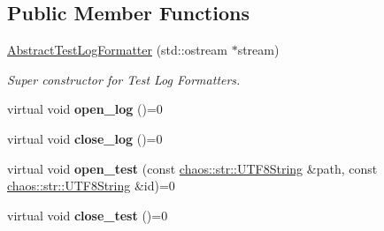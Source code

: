 \subsection*{Public Member Functions}
\begin{DoxyCompactItemize}
\item 
\hyperlink{classchaos_1_1test_1_1log__formatter_1_1_abstract_test_log_formatter_a9b6256dad677274ae028f14a3f713ca0}{Abstract\+Test\+Log\+Formatter} (std\+::ostream $\ast$stream)
\begin{DoxyCompactList}\small\item\em Super constructor for Test Log Formatters. \end{DoxyCompactList}\item 
\hypertarget{classchaos_1_1test_1_1log__formatter_1_1_abstract_test_log_formatter_ae60e3b695f6c2a7e26944c1b0b644136}{}virtual void {\bfseries open\+\_\+log} ()=0\label{classchaos_1_1test_1_1log__formatter_1_1_abstract_test_log_formatter_ae60e3b695f6c2a7e26944c1b0b644136}

\item 
\hypertarget{classchaos_1_1test_1_1log__formatter_1_1_abstract_test_log_formatter_a2884dd5deee2b1f29b971493fdc3bca3}{}virtual void {\bfseries close\+\_\+log} ()=0\label{classchaos_1_1test_1_1log__formatter_1_1_abstract_test_log_formatter_a2884dd5deee2b1f29b971493fdc3bca3}

\item 
\hypertarget{classchaos_1_1test_1_1log__formatter_1_1_abstract_test_log_formatter_a506782a79c28119c9286bcbe6d0df855}{}virtual void {\bfseries open\+\_\+test} (const \hyperlink{classchaos_1_1str_1_1_u_t_f8_string}{chaos\+::str\+::\+U\+T\+F8\+String} \&path, const \hyperlink{classchaos_1_1str_1_1_u_t_f8_string}{chaos\+::str\+::\+U\+T\+F8\+String} \&id)=0\label{classchaos_1_1test_1_1log__formatter_1_1_abstract_test_log_formatter_a506782a79c28119c9286bcbe6d0df855}

\item 
\hypertarget{classchaos_1_1test_1_1log__formatter_1_1_abstract_test_log_formatter_ae88303d5d75855ed7f65fd4e73387704}{}virtual void {\bfseries close\+\_\+test} ()=0\label{classchaos_1_1test_1_1log__formatter_1_1_abstract_test_log_formatter_ae88303d5d75855ed7f65fd4e73387704}

\end{DoxyCompactItemize}
